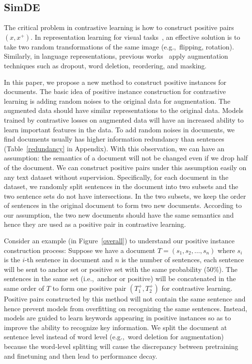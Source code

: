 \documentclass[11pt]{article}
\begin{document}
\subsection{SimDE}
The critical problem in contrastive learning is how to construct positive pairs $(x, x^{+})$.
In representation learning for visual tasks~\cite{Chen2020ASF}, an effective solution is to take two random transformations of the same image (e.g.,~flipping, rotation).
Similarly, in language representations, previous works~\cite{Gao2021SimCSESC, Karpukhin2020DensePR, Meng2021COCOLMCA, Li2022UCTopicUC} apply augmentation techniques such as dropout, word deletion, reordering, and masking.

In this paper, we propose a new method to construct positive instances for documents. 
The basic idea of positive instance construction for contrastive learning is adding random noises to the original data for augmentation. 
The augmented data should have similar representations to the original data. 
Models trained by contrastive losses on augmented data will have an increased ability to learn important features in the data.
To add random noises in documents, we find documents usually has higher information redundancy than sentences (Table~\ref{redundancy} in Appendix). 
With this observation, we can have an assumption: 
the semantics of a document will not be changed even if we drop half of the document. 
We can construct positive pairs under this assumption easily on any text dataset without supervision.
Specifically, for each document in the dataset, we randomly split sentences in the document into two subsets and the two sentence sets do not have intersections. 
In the two subsets, we keep the order of sentences in the original document to form two new documents. 
According to our assumption, the two new documents should have the same semantics and hence they are used as a positive pair in contrastive learning. 

Consider an example (in Figure~\ref{overall}) to understand our positive instance construction process:
Suppose we have a document $T = (s_1, s_2,\dots,s_n)$ where $s_i$ is the $i$-th sentence in document and $n$ is the number of sentences, each sentence will be sent to anchor set or positive set with the same probability ($50\%$). 
The sentences in the same set (i.e.,~anchor or positive) will be concatenated in the same order of $T$ to form one positive pair $(T^+_1, T^+_2)$ for contrastive learning. 
Positive pairs constructed by this method will not contain the same sentence and hence prevent models from overfitting on recognizing the same sentences. 
Instead, models are guided to learn keywords appearing in positive instances so as to improve the ability to recognize key information. 
We split the document at sentence level instead of word level (e.g.,~word deletion for augmentation) because the word-level splitting will cause the discrepancy between pretraining and finetuning and then lead to performance decay.
\end{document}
